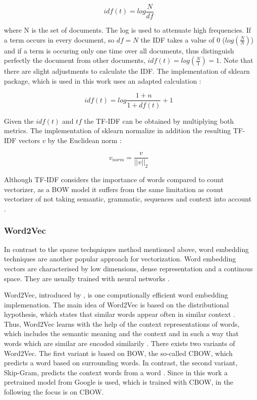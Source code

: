 \documentclass[12pt, a4paper, titlepage]{article}
\begin{document}
\[idf(t) = log \frac{N}{df} \]

where N is the set of documents. The log is used to attenuate high frequencies. If a term occurs in every document, so $df = N$ the \ac{IDF} takes a value of 0 ($log (\frac{N}{N})$) and if a term is occuring only one time over all documents, thus distinguish perfectly the document from other documents, $idf(t) = log (\frac{N}{1}) = 1$. \citep{sidorov2019} Note that there are slight adjustments to calculate the \ac{IDF}. \citep{robertson2004} The implementation of sklearn package, which is used in this work uses an adapted calculation \citep{scikit-learn}:

\[idf(t) = log \frac{1+n}{1+df(t)} + 1 \] 

Given the $idf(t)$ and $tf$ the \ac{TF-IDF} can be obtained by multiplying both metrics. The implementation of sklearn normalize in addition the resulting \ac{TF-IDF} vectors $v$ by the Euclidean norm \citep{scikit-learn}: 

\[v_{norm} = \frac{v}{||v||_2} \]

Although \ac{TF-IDF} considers the importance of words compared to count vectorizer, as a \ac{BOW} model it suffers from the same limitation as count vectorizer of not taking semantic, grammatic, sequences and context into account \citep{sarkar2016}. 

\subsubsection{Word2Vec}
In contrast to the sparse techqniques method mentioned above, word embedding techniques are another popular approach for vectorization. Word embedding vectors are characterised by low dimensions, dense representation and a continous space. They are usually trained with neural networks \citep{li2015, jin2016}. 

Word2Vec, introduced by \citet{mikolov2013}, is one computionally efficient word embedding implemenation. The main idea of Word2Vec is based on the distributional hypothesis, which states that similar words appear often in similar context \citep{sahlgren2008}. Thus, Word2Vec learns with the help of the context representations of words, which includes the semantic meaning and the context and in such a way that words which are similar are encoded similarily \citep{sarkar2016}. There exists two variants of Word2Vec. The first variant is based on \ac{BOW}, the so-called \ac{CBOW}, which predicts a word based on surrounding words. In contrast, the second variant, Skip-Gram, predicts the context words from a word \citep{ajose2020, sarkar2016}. Since in this work a pretrained model from Google is used, which is trained with CBOW, in the following the focus is on \ac{CBOW}. 
\end{document}
